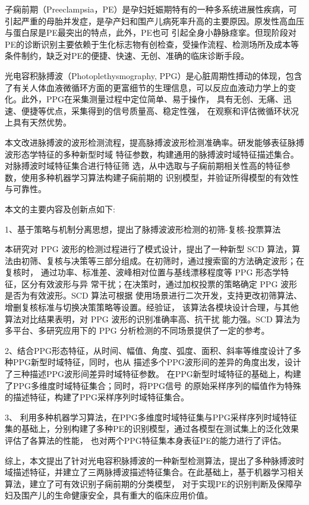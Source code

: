 \cleardoublepage
{}
子痫前期（Preeclampsia，PE）是孕妇妊娠期特有的一种多系统进展性疾病，可引起严重的母胎并发症，是孕产妇和围产儿病死率升高的主要原因。原发性高血压与蛋白尿是PE最突出的特点，此外，PE也可
引起全身小静脉痉挛。但现阶段对PE的诊断识别主要依赖于生化标志物有创检查，受操作流程、检测场所及成本等条件制约，缺乏对PE的便捷、快速、无创、准确的临床诊断手段。

光电容积脉搏波（Photoplethysmography, PPG）是心脏周期性搏动的体现，包含了有关人体血液微循环方面的更富细节的生理信息，可以反应血液动力学上的变化。此外，PPG在采集测量过程中定位简单、易于操作，
具有无创、无痛、迅速、便捷等优点，采集得到的信号质量高、稳定性强，
在观察和评估微循环状况上具有天然优势。

本文改进脉搏波的波形检测流程，提高脉搏波波形检测准确率。研发能够表征脉搏波形态学特征的多种新型时域
特征参数，构建通用的脉搏波时域特征描述集合。对脉搏波时域特征集合进行特征筛
选，从中选取与子痫前期相关性高的特征参数，使用多种机器学习算法构建子痫前期的
识别模型，并验证所得模型的有效性与可靠性。

本文的主要内容及创新点如下:

1、基于策略与机制分离思想，提出了脉搏波波形检测的初筛-复核-投票算法

本研究对 PPG 波形的检测过程进行了模式设计，提出了一种新型 SCD 算法，算
法由初筛、复核与决策等三部分组成。在初筛时，通过搜索窗的方法确定波形；在复核时，
通过功率、标准差、波峰相对位置与基线漂移程度等 PPG 形态学特征，区分有效波形与异
常干扰；在决策时，通过加权投票的策略确定 PPG 波形是否为有效波形。SCD 算法可根据
使用场景进行二次开发，支持更改初筛算法、增删复核标准与切换决策策略等设置。经验证，
该算法各模块设计合理，与其他算法对比结果表明，对 PPG 波形的识别准确率高、抗干扰
能力强。SCD 算法为多平台、多研究应用下的 PPG 分析检测的不同场景提供了一定的参考。

2、结合PPG形态特征，从时间、幅值、角度、弧度、面积、斜率等维度设计了多种PPG新型时域特征，同时，也从
描述多个PPG波形间的差异的角度出发，设计了三种描述PPG波形间差异时域特征参数。
在PPG新型时域特征的基础上，构建了PPG多维度时域特征集合；同时，将PPG信号
的原始采样序列的幅值作为特殊的描述特征，构建了PPG采样序列时域特征集合。

3、 利用多种机器学习算法，在PPG多维度时域特征集与PPG采样序列时域特征集的基础上，分别构建了多种PE的识别模型，通过各模型在测试集上的泛化效果评估了各算法的性能，
也对两个PPG特征集本身表征PE的能力进行了评估。

综上，本文提出了针对光电容积脉搏波的一种新型检测算法，提出了多种脉搏波时域描述特征，并建立了三两脉搏波描述特征集合。在此基础上，基于机器学习相关算法，建立了可有效识别子痫前期的分类模型，
对于实现PE的识别判断及保障孕妇及围产儿的生命健康安全，具有重大的临床应用价值。


